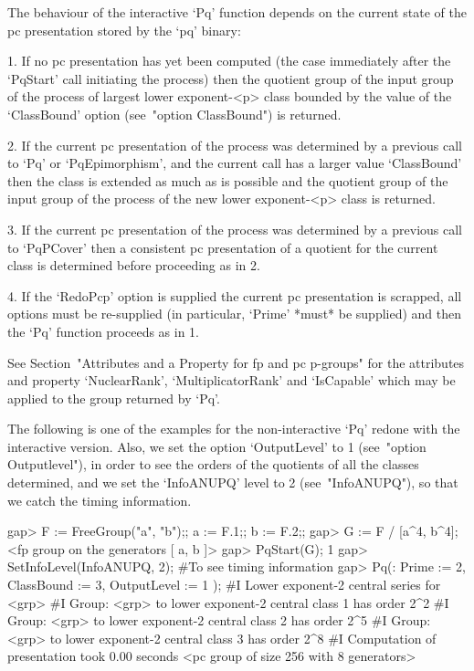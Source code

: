 The behaviour of the interactive `Pq' function  depends  on  the  current
state of the pc presentation stored by the `pq' binary:

\beginlist%

\item{1.}
If no pc presentation has yet been computed (the case  immediately  after
the `PqStart' call initiating the process) then the quotient group of the
input group of the process of largest lower exponent-<p> class bounded by
the  value  of  the  `ClassBound'  option  (see~"option  ClassBound")  is
returned.

\item{2.}
If the current pc  presentation  of  the  process  was  determined  by  a
previous call to `Pq' or `PqEpimorphism', and  the  current  call  has  a
larger value `ClassBound' then the  class  is  extended  as  much  as  is
possible and the quotient group of the input group of the process of  the
new lower exponent-<p> class is returned.

\item{3.}
If the current pc  presentation  of  the  process  was  determined  by  a
previous call to `PqPCover'  then  a  consistent  pc  presentation  of  a
quotient for the current class is determined before proceeding as in 2.

\item{4.}
If the `RedoPcp' option  is  supplied  the  current  pc  presentation  is
scrapped, all options must be re-supplied (in particular, `Prime'  *must*
be supplied) and then the `Pq' function proceeds as in 1.

\endlist

See Section~"Attributes and a Property for fp and pc  p-groups"  for  the
attributes   and   property   `NuclearRank',   `MultiplicatorRank'    and
`IsCapable' which may be applied to the group returned by `Pq'.

The following is one of the examples for the non-interactive `Pq'  redone
with the interactive version. Also, we set the option `OutputLevel' to  1
(see~"option   Outputlevel"), in order to see the orders of the quotients
of all the classes determined, and we set  the  `InfoANUPQ'  level  to  2
(see~"InfoANUPQ"), so that we catch the timing information.

\beginexample
gap> F := FreeGroup("a", "b");; a := F.1;; b := F.2;;
gap> G := F / [a^4, b^4];
<fp group on the generators [ a, b ]>
gap> PqStart(G);
1
gap> SetInfoLevel(InfoANUPQ, 2); #To see timing information               
gap> Pq(: Prime := 2, ClassBound := 3, OutputLevel := 1 );
#I  Lower exponent-2 central series for <grp>
#I  Group: <grp> to lower exponent-2 central class 1 has order 2^2
#I  Group: <grp> to lower exponent-2 central class 2 has order 2^5
#I  Group: <grp> to lower exponent-2 central class 3 has order 2^8
#I  Computation of presentation took 0.00 seconds
<pc group of size 256 with 8 generators>
\endexample


